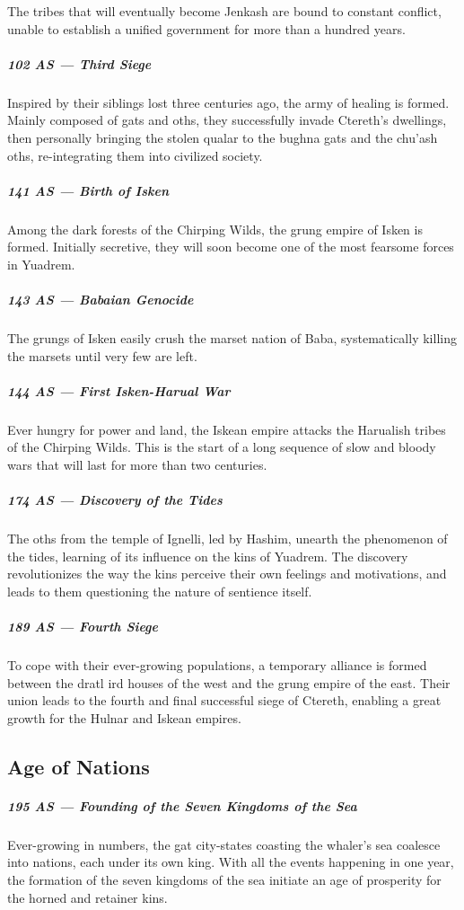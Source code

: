 The tribes that will eventually become Jenkash are bound to constant conflict, unable to establish a unified government for more than a hundred years.

\subparagraph{102 AS --- Third Siege} Inspired by their siblings lost three centuries ago, the army of healing is formed.
Mainly composed of gats and oths, they successfully invade Ctereth's dwellings, then personally bringing the stolen qualar to the bughna gats and the chu'ash oths, re-integrating them into civilized society.

\subparagraph{141 AS --- Birth of Isken} Among the dark forests of the Chirping Wilds, the grung empire of Isken is formed.
Initially secretive, they will soon become one of the most fearsome forces in Yuadrem.

\subparagraph{143 AS --- Babaian Genocide} The grungs of Isken easily crush the marset nation of Baba, systematically killing the marsets until very few are left.

\subparagraph{144 AS --- First Isken-Harual War} Ever hungry for power and land, the Iskean empire attacks the Harualish tribes of the Chirping Wilds.
This is the start of a long sequence of slow and bloody wars that will last for more than two centuries.

\subparagraph{174 AS --- Discovery of the Tides} The oths from the temple of Ignelli, led by Hashim, unearth the phenomenon of the tides, learning of its influence on the kins of Yuadrem.
The discovery revolutionizes the way the kins perceive their own feelings and motivations, and leads to them questioning the nature of sentience itself.

\subparagraph{189 AS --- Fourth Siege} To cope with their ever-growing populations, a temporary alliance is formed between the dratl ird houses of the west and the grung empire of the east.
Their union leads to the fourth and final successful siege of Ctereth, enabling a great growth for the Hulnar and Iskean empires.

\subsection*{Age of Nations}
\subparagraph{195 AS --- Founding of the Seven Kingdoms of the Sea} Ever-growing in numbers, the gat city-states coasting the whaler's sea coalesce into nations, each under its own king.
With all the events happening in one year, the formation of the seven kingdoms of the sea initiate an age of prosperity for the horned and retainer kins.

